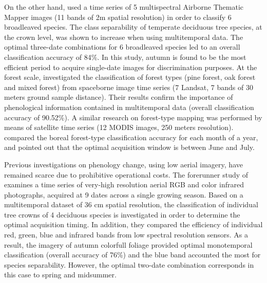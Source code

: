 \documentclass[remotesensing,article,submit,moreauthors,pdftex,12pt,a4paper]{mdpi} %
\begin{document}
On the other hand, \citeauthor{hill_mapping_2010} \cite{hill_mapping_2010} used a time series of 5 multispectral Airborne Thematic Mapper images (11 bands of 2m spatial resolution) in order to classify 6 broadleaved species. 
The class separability of temperate deciduous tree species, at the crown level, was shown to increase when using multitemporal data. 
The optimal three-date combinations for 6 broadleaved species led to an overall classification accuracy of 84\%. 
In this study, autumn is found to be the most efficient period to acquire single-date images for discrimination purposes. 
At the forest scale, \citeauthor{zhu_accurate_2014} \cite{zhu_accurate_2014} investigated the classification of forest types (pine forest, oak forest and mixed forest) from spaceborne image time series (7 Landsat, 7 bands of 30 meters ground sample distance). 
Their results confirm the importance of phenological information contained in multitemporal data (overall classification accuracy of 90.52\%). 
A similar research on forest-type mapping was performed by means of satellite time series (12 MODIS images, 250 meters resolution). 
\citeauthor{kempeneers_data_2011} \cite{kempeneers_data_2011} compared the boreal forest-type classification accuracy for each month of a year, and pointed out that the optimal acquisition window is between June and July.


Previous investigations on phenology change, using low aerial imagery, have remained scarce due to prohibitive operational costs. 
The forerunner study of \citeauthor{key_comparison_2001} \cite{key_comparison_2001} examines a time series of very-high resolution aerial RGB and color infrared photographs, acquired at 9 dates across a single growing season. 
Based on a multitemporal dataset of 36 cm spatial resolution, the classification of individual tree crowns of 4 deciduous species is investigated in order to determine the optimal acquisition timing. 
In addition, they compared the efficiency of individual red, green, blue and infrared bands from low spectral resolution sensors. 
As a result, the imagery of autumn colorfull foliage provided optimal monotemporal classification (overall accuracy of 76\%) and the blue band accounted the most for species separability. 
However, the optimal two-date combination corresponds in this case to spring and midsummer. 
\end{document}
